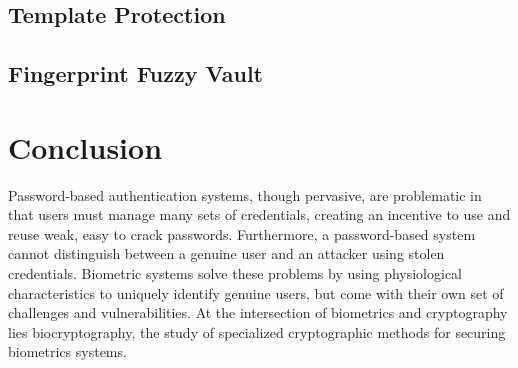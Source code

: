 \documentclass[11pt]{article}
\begin{document}
\subsection{Template Protection}

\subsection{Fingerprint Fuzzy Vault}

\section{Conclusion}
Password-based authentication systems, though pervasive, are problematic in
that users must manage many sets of credentials, creating an incentive to use
and reuse weak, easy to crack passwords. Furthermore, a password-based system
cannot distinguish between a genuine user and an attacker using stolen credentials. Biometric systems solve these problems by using physiological characteristics 
to uniquely identify genuine users, but come with their own set of challenges
and vulnerabilities. At the intersection of biometrics and cryptography 
lies biocryptography, the study of specialized cryptographic methods for 
securing biometrics systems. 


\singlespace
\nocite{*}

{}

\end{document}
